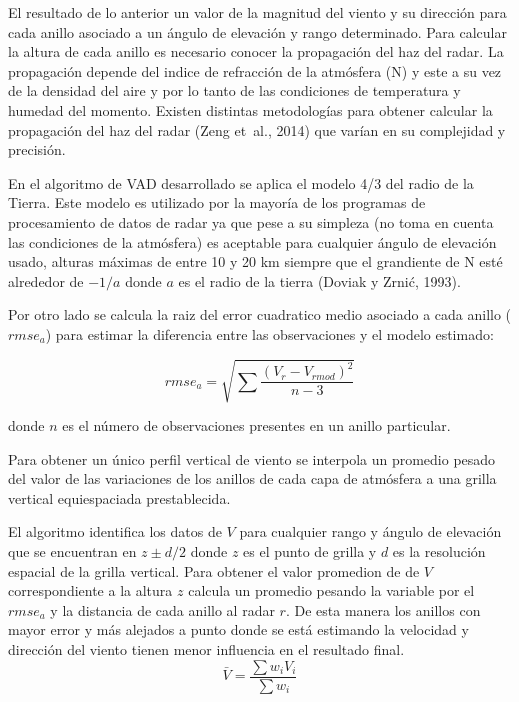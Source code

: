 \documentclass[12pt,spanish,oneside]{book}
\begin{document}
El resultado de lo anterior un valor de la magnitud del viento y su
dirección para cada anillo asociado a un ángulo de elevación y rango
determinado. Para calcular la altura de cada anillo es necesario conocer
la propagación del haz del radar. La propagación depende del indice de
refracción de la atmósfera (N) y este a su vez de la densidad del aire y
por lo tanto de las condiciones de temperatura y humedad del momento.
Existen distintas metodologías para obtener calcular la propagación del
haz del radar (Zeng et~al., 2014) que varían en su complejidad y
precisión.

En el algoritmo de VAD desarrollado se aplica el modelo 4/3 del radio de
la Tierra. Este modelo es utilizado por la mayoría de los programas de
procesamiento de datos de radar ya que pese a su simpleza (no toma en
cuenta las condiciones de la atmósfera) es aceptable para cualquier
ángulo de elevación usado, alturas máximas de entre 10 y 20 km siempre
que el grandiente de N esté alrededor de \(-1/a\) donde \(a\) es el
radio de la tierra (Doviak y Zrnić, 1993).

Por otro lado se calcula la raiz del error cuadratico medio asociado a
cada anillo (\(rmse_a\)) para estimar la diferencia entre las
observaciones y el modelo estimado:

\begin{equation}\label{eq-vr8}
rmse_a = \sqrt {\sum \frac {(V_r - V_{rmod} )^2} {n-3}}
\end{equation}

donde \(n\) es el número de observaciones presentes en un anillo
particular.

Para obtener un único perfil vertical de viento se interpola un promedio
pesado del valor de las variaciones de los anillos de cada capa de
atmósfera a una grilla vertical equiespaciada prestablecida.

El algoritmo identifica los datos de \(V\) para cualquier rango y ángulo
de elevación que se encuentran en \(z \pm d/2\) donde \(z\) es el punto
de grilla y \(d\) es la resolución espacial de la grilla vertical. Para
obtener el valor promedion de de \(V\) correspondiente a la altura \(z\)
calcula un promedio pesando la variable por el \(rmse_a\) y la distancia
de cada anillo al radar \(r\). De esta manera los anillos con mayor
error y más alejados a punto donde se está estimando la velocidad y
dirección del viento tienen menor influencia en el resultado final.\\

\begin{equation}\label{eq-vr9}
\bar{V} = \frac {\sum w_i V_i} {\sum w_i}
\end{equation}
\end{document}

